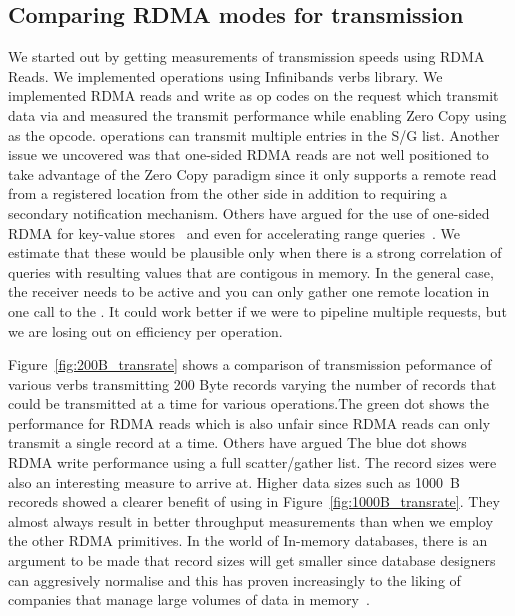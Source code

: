 \subsection{Comparing RDMA modes for transmission}
We started out by getting measurements of transmission speeds using RDMA Reads.
We implemented operations using Infinibands verbs library. We implemented 
RDMA reads and write as op codes on the  request which 
transmit data via  and measured the transmit 
performance while enabling Zero Copy using  as the opcode.
 operations can transmit multiple entries in the S/G list.
Another issue we uncovered was that one-sided RDMA reads are not well positioned to 
take advantage of the Zero Copy paradigm since it only supports a remote read 
from a registered location from the other side in addition to requiring a secondary notification mechanism.
Others have argued for the use of one-sided RDMA for key-value stores~\cite{pilaf} and even for accelerating 
range queries~\cite{zerocopyrangequery}. We estimate that these would be plausible only when there is a strong 
correlation of queries with resulting values that are contigous in memory. In the general case, the receiver 
needs to be active and you can  only gather one remote location in one call to the .
It could work better if we were to pipeline multiple requests, but we are losing out on efficiency per operation.

Figure~\ref{fig:200B_transrate} shows a comparison of transmission
peformance of various verbs transmitting 200 Byte records varying the number of records
that could be transmitted at a time for various operations.The green dot shows
the performance for RDMA reads which is also unfair
since RDMA reads can only transmit a single record at a time. Others have argued The blue dot
shows RDMA write performance using a full scatter/gather list. The record sizes were 
also an interesting measure to arrive at. Higher data sizes such as 1000~B recoreds showed a clearer benefit of using  in Figure~\ref{fig:1000B_transrate}.
They almost always result in better throughput measurements than when we employ the other RDMA primitives.
In the world of In-memory databases,
there is an argument to be made that record sizes will get smaller since 
database designers can aggresively normalise and this has proven increasingly to
the liking of companies that manage large volumes of data in memory~\cite{fb-memcache,fb-workload,inmemoryworkload}.
\clearpage




